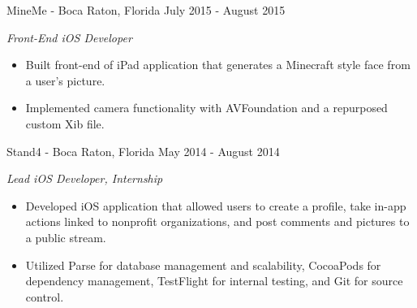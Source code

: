 \documentclass[print]{resume}
\begin{document}
\begin{entrylist}
\entry
{}
{MineMe \thinfont\footnotesize{}- Boca Raton, Florida}
{July 2015 - August 2015}
{
\emph{Front-End iOS Developer}
\begin{itemize}
    \item Built front-end of iPad application that generates a Minecraft style face from a user's picture.
	\item Implemented camera functionality with AVFoundation and a repurposed custom Xib file.
\end{itemize}
}

\entry
{}
{Stand4 \thinfont\footnotesize{}- Boca Raton, Florida}
{May 2014 - August 2014}
{
\emph{Lead iOS Developer, Internship}
\begin{itemize}
    \item Developed iOS application that allowed users to create a profile, take in-app actions linked to nonprofit organizations, and post comments and pictures to a public stream.  
    \item Utilized Parse for database management and scalability, CocoaPods for dependency management, TestFlight for internal testing, and Git for source control.
\end{itemize}
}

\end{entrylist}

\vspace{-10pt} %

\end{document}
